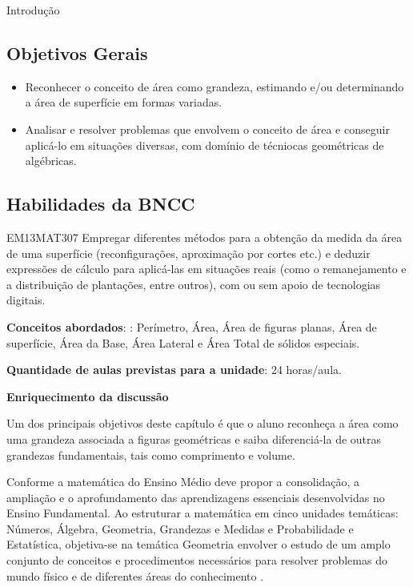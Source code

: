 \begin{apresentacao}{Introdução}
\subsection{Objetivos Gerais}
\begin{itemize}
\item Reconhecer o conceito de área como grandeza, estimando e/ou determinando a área de superfície em formas variadas.
\item Analisar e resolver problemas que envolvem o conceito de área e conseguir aplicá-lo em situações diversas, com domínio de técniocas geométricas de algébricas.
\end{itemize}

\subsection{Habilidades da BNCC}
\begin{habilities}{EM13MAT307}
Empregar diferentes métodos para a obtenção da medida da área de uma superfície (reconfigurações, aproximação por cortes etc.) e deduzir expressões de cálculo para aplicá-las em situações reais (como o remanejamento e a distribuição de plantações, entre outros), com ou sem apoio de tecnologias digitais.
\end{habilities}

\textbf{Conceitos abordados}: : Perímetro, Área, Área de figuras planas, Área de superfície, Área da Base, Área Lateral e Área Total de sólidos especiais.

\textbf{Quantidade de aulas previstas para a unidade}: 24 horas/aula.

\textbf{Enriquecimento da discussão}

Um dos principais objetivos deste capítulo é que o aluno reconheça a área como uma grandeza associada a figuras geométricas e saiba diferenciá-la de outras grandezas fundamentais, tais como comprimento e volume. 

Conforme \citet{BNCC2019} a matemática do Ensino Médio deve propor a consolidação, a ampliação e o aprofundamento das aprendizagens essenciais desenvolvidas no Ensino Fundamental. Ao estruturar a matemática em cinco unidades temáticas: Números, Álgebra, Geometria, Grandezas e Medidas e Probabilidade e Estatística, objetiva-se na temática Geometria envolver o estudo de um amplo conjunto de conceitos e procedimentos necessários para resolver problemas do mundo físico e de diferentes áreas do conhecimento \cite{BNCC2019}.


\end{apresentacao}
